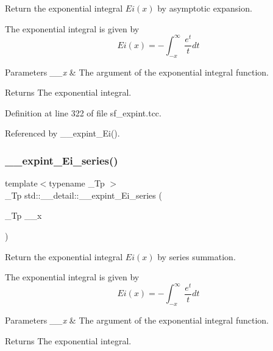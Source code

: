 Return the exponential integral $ Ei(x) $ by asymptotic expansion. 

The exponential integral is given by \[ Ei(x) = -\int_{-x}^\infty \frac{e^t}{t} dt \]


\begin{DoxyParams}{Parameters}
{\em \+\_\+\+\_\+x} & The argument of the exponential integral function. \\
\hline
\end{DoxyParams}
\begin{DoxyReturn}{Returns}
The exponential integral. 
\end{DoxyReturn}


Definition at line 322 of file sf\+\_\+expint.\+tcc.



Referenced by \+\_\+\+\_\+expint\+\_\+\+Ei().

\mbox{\label{namespacestd_1_1____detail_a7582d1305e84e0263cc6ec2a00a2bf7d}} 
\subsubsection{\texorpdfstring{\+\_\+\+\_\+expint\+\_\+\+Ei\+\_\+series()}{\_\_expint\_Ei\_series()}}
{\footnotesize\ttfamily template$<$typename \+\_\+\+Tp $>$ \\
\+\_\+\+Tp std\+::\+\_\+\+\_\+detail\+::\+\_\+\+\_\+expint\+\_\+\+Ei\+\_\+series (\begin{DoxyParamCaption}\item[{\+\_\+\+Tp}]{\+\_\+\+\_\+x }\end{DoxyParamCaption})}



Return the exponential integral $ Ei(x) $ by series summation. 

The exponential integral is given by \[ Ei(x) = -\int_{-x}^\infty \frac{e^t}{t} dt \]


\begin{DoxyParams}{Parameters}
{\em \+\_\+\+\_\+x} & The argument of the exponential integral function. \\
\hline
\end{DoxyParams}
\begin{DoxyReturn}{Returns}
The exponential integral. 
\end{DoxyReturn}


